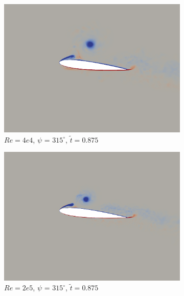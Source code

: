 \begin{figure}[H]
	\begin{subfigure}[b]{0.32\textwidth}
		\centering
		\includegraphics[width=1\textwidth]{figures/Vorticity_plots/Re_40k_1pt0/phase_315.png}
		\caption{$Re=4e4$, $\psi$ = $315^\circ$, $\tilde{t}=0.875$}
		\label{fig:Re_40k_1pt0_phi315}
	\end{subfigure}
	\begin{subfigure}[b]{0.32\textwidth}
		\centering
		\includegraphics[width=1\textwidth]{figures/Vorticity_plots/Re_200k_1pt0/phase_315.png}
		\caption{$Re=2e5$, $\psi$ = $315^\circ$, $\tilde{t}=0.875$}
		\label{fig:Re_200k_1pt0_phi315}
	\end{subfigure}
	\begin{subfigure}[b]{0.32\textwidth}
		\centering

\end{subfigure}
\end{figure}
